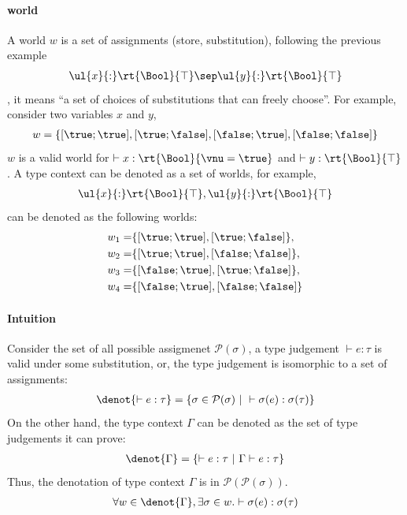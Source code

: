 \paragraph{world} A world $w$ is a set of assignments (store, substitution), following the previous example
\begin{align*}
    \ul{x}{:}\rt{\Bool}{\top} \sep \ul{y}{:}\rt{\Bool}{\top}
\end{align*}\noindent
, it means ``a set of choices of substitutions that can freely choose''. For example, consider two variables $x$ and $y$, 
\begin{align*}
    w = \{ [\true; \true], [\true; \false], [\false; \true], [\false; \false] \}
\end{align*}\noindent
$w$ is a valid world for $\vdash x : \rt{\Bool}{\vnu = \true}$ and $\vdash y : \rt{\Bool}{\top}$.
A type context can be denoted as a set of worlds, for example,
\begin{align*}
    \ul{x}{:}\rt{\Bool}{\top}, \ul{y}{:}\rt{\Bool}{\top}
\end{align*}\noindent
can be denoted as the following worlds:
\begin{align*}
    w_1 = &\{[\true; \true], [\true; \false]\}, 
    \\w_2 = &\{[\true; \true], [\false; \false]\}, 
    \\w_3 = &\{[\false; \true], [\true; \false]\}, 
    \\w_4 = &\{[\false; \true], [\false; \false]\}
\end{align*}\noindent

\paragraph{Intuition} Consider the set of all possible assigmenet $\mathcal{P}(\sigma)$, a type judgement $\vdash e:\tau$ is valid under some substitution, or, the type judgement is isomorphic to a set of assignments:
\begin{align*}
    \denot{\vdash e:\tau} = \{ \sigma \in \mathcal{P}(\sigma) ~|~ \vdash \sigma(e) : \sigma(\tau) \}
\end{align*}\noindent
On the other hand, the type context $\Gamma$ can be denoted as the set of type judgements it can prove:
\begin{align*}
    \denot{\Gamma} = \{ \vdash e:\tau ~|~ \Gamma \vdash e:\tau \}
\end{align*}\noindent
Thus, the denotation of type context $\Gamma$ is in $\mathcal{P}(\mathcal{P}(\sigma))$.
\begin{align*}
    \forall w \in \denot{\Gamma}, \exists \sigma \in w. \vdash \sigma(e) : \sigma(\tau)
\end{align*}\noindent

